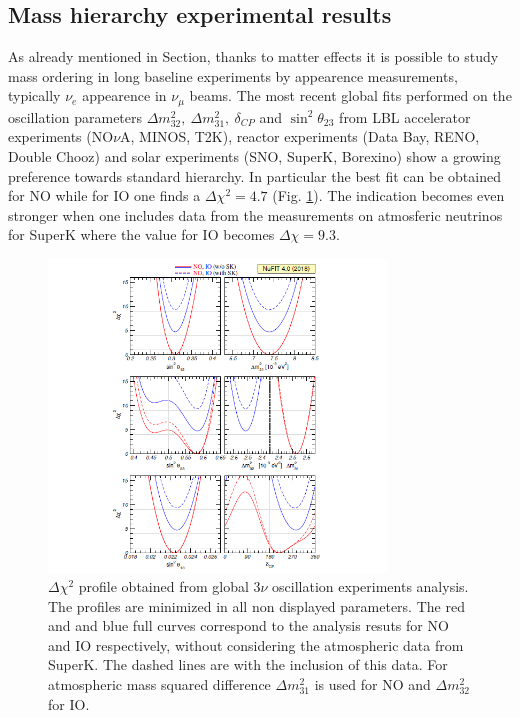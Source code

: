 \documentclass[12pt,a4paper,openright,twoside]{report}
\begin{document}
\subsection {Mass hierarchy experimental results}
As already mentioned in Section, thanks to matter effects it is possible to study mass ordering in long baseline experiments by appearence measurements, typically $\nu_e$ appearence in $\nu_\mu$ beams. The most recent global fits performed on the oscillation parameters $\Delta m_{32}^2, \ \Delta m_{31}^2, \ \delta_{CP}$ and $\sin^2\theta_{23}$ from LBL accelerator experiments (NO$\nu$A, MINOS, T2K), reactor experiments (Data Bay, RENO, Double Chooz) and solar experiments (SNO, SuperK, Borexino) show a growing preference towards standard hierarchy. In particular the best fit can be obtained for NO while for IO one finds a $\Delta\chi ^2=4.7$ (Fig. \ref{masshierarchy3:fig}). The indication becomes even stronger when one includes data from the measurements on atmosferic neutrinos for SuperK where the value for IO becomes $\Delta\chi = 9.3$.
\begin{figure}
	\centering
	\includegraphics[width=0.8\textwidth]{massexp.png}
	\caption{\label{masshierarchy3:fig} $\Delta\chi^2$ profile obtained from global 3$\nu$ oscillation experiments analysis. The profiles are minimized in all non displayed parameters. The red and and blue full curves correspond to the analysis resuts for NO and IO respectively, without considering the atmospheric data from SuperK. The dashed lines are with the inclusion of this data. For atmospheric mass squared difference $\Delta m_{31}^2$ is used for NO and $\Delta m_{32}^2$ for IO.}
\end{figure}
\end{document}
